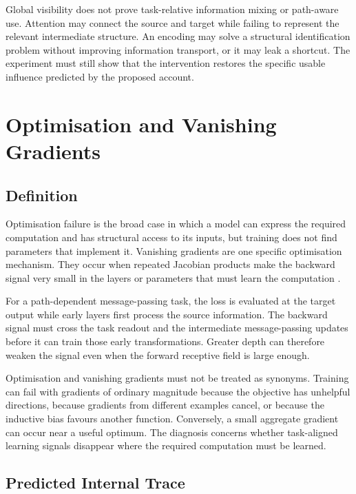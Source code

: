 Global visibility does not prove task-relative information mixing or path-aware use.
Attention may connect the source and target while failing to represent the relevant intermediate structure.
An encoding may solve a structural identification problem without improving information transport, or it may leak a shortcut.
The experiment must still show that the intervention restores the specific usable influence predicted by the proposed account.

\section{Optimisation and Vanishing Gradients}

\subsection{Definition}

Optimisation failure is the broad case in which a model can express the required computation and has structural access to its inputs, but training does not find parameters that implement it.
Vanishing gradients are one specific optimisation mechanism.
They occur when repeated Jacobian products make the backward signal very small in the layers or parameters that must learn the computation \cite{bengio1994learning,glorot2010difficulty}.

For a path-dependent message-passing task, the loss is evaluated at the target output while early layers first process the source information.
The backward signal must cross the task readout and the intermediate message-passing updates before it can train those early transformations.
Greater depth can therefore weaken the signal even when the forward receptive field is large enough.

Optimisation and vanishing gradients must not be treated as synonyms.
Training can fail with gradients of ordinary magnitude because the objective has unhelpful directions, because gradients from different examples cancel, or because the inductive bias favours another function.
Conversely, a small aggregate gradient can occur near a useful optimum.
The diagnosis concerns whether task-aligned learning signals disappear where the required computation must be learned.

\subsection{Predicted Internal Trace}

